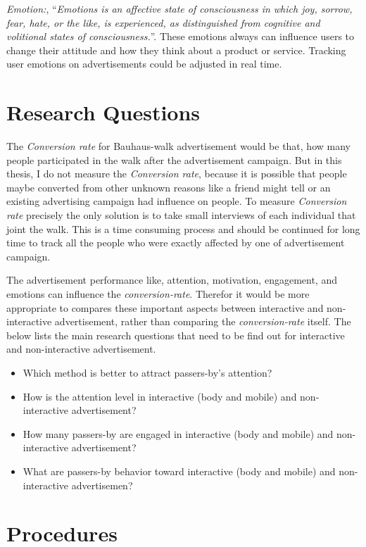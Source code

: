 \emph{Emotion:}, ``\emph{Emotions is an affective state of consciousness in which joy, sorrow, fear, hate, or the like, is experienced, as distinguished from cognitive and volitional states of consciousness.}''\cite{emotiondef}. These emotions always can influence users to change their attitude and how they think about a product or service. Tracking user emotions on advertisements could be adjusted in real time.



\section{Research Questions}
The \emph{Conversion rate} for Bauhaus-walk advertisement would be that, how many people participated in the walk after the advertisement campaign. But in this thesis, I do not measure the \emph{Conversion rate}, because it is possible that people maybe converted from other unknown reasons like a friend might tell or an existing advertising campaign had influence on people. To measure \emph{Conversion rate} precisely the only solution is to take small interviews of each individual that joint the walk. This is a time consuming process and should be continued for long time to track all the people who were exactly affected by one of advertisement campaign.

The advertisement performance like, attention, motivation, engagement, and emotions can influence the \emph{conversion-rate}. Therefor it would be more appropriate to compares these important aspects between interactive and non-interactive advertisement, rather than comparing the \emph{conversion-rate} itself. The below lists the main research questions that need to be find out for interactive and non-interactive advertisement.



\begin{itemize}
\item Which method is better to attract passers-by's attention? 
\item How is the attention level in interactive (body and mobile) and non-interactive advertisement?
\item How many passers-by are engaged in interactive (body and mobile) and non-interactive advertisement?
\item What are passers-by behavior toward interactive (body and mobile) and non-interactive advertisemen?
\end{itemize}

\section{Procedures}

